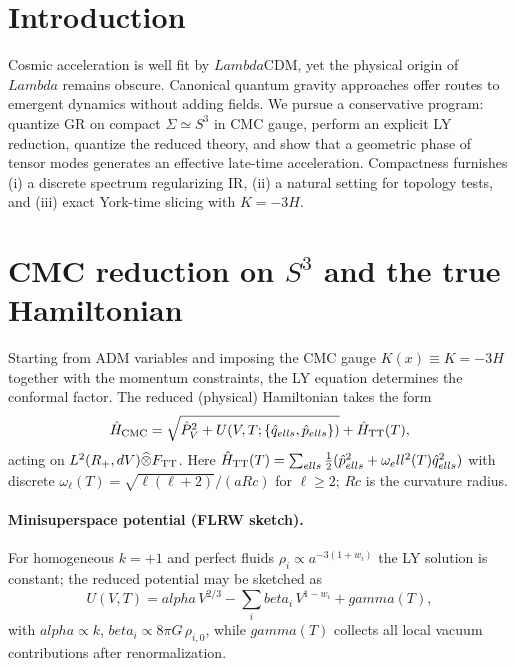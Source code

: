 \documentclass[aps,prd,twocolumn,amsmath,amssymb,nofootinbib,superscriptaddress]{revtex4-2}
\def\mathbb#1{#1}%
\def\mathcal#1{#1}%
\def\Rc{Rc}%
\def\Lambda{Lambda}%
\def\alpha{alpha}\def\beta{beta}\def\gamma{gamma}%
\newcommand{\Rc}{\mathcal{R}_c}
\newcommand{\cU}{\mathcal{U}}
\begin{document}
\section{Introduction}
Cosmic acceleration is well fit by $\Lambda$CDM, yet the physical origin of $\Lambda$ remains obscure. Canonical quantum gravity approaches \cite{DeWitt1967,HartleHawking,Vilenkin} offer routes to emergent dynamics without adding fields. We pursue a conservative program: quantize GR on compact $\Sigma\simeq S^3$ in CMC gauge, perform an explicit LY reduction, quantize the reduced theory, and show that a geometric phase of tensor modes generates an effective late-time acceleration. Compactness furnishes (i) a discrete spectrum regularizing IR, (ii) a natural setting for topology tests, and (iii) exact York-time slicing with $K=-3H$.

\section{CMC reduction on $S^3$ and the true Hamiltonian}
Starting from ADM variables and imposing the CMC gauge $K(x)\equiv K=-3H$ together with the momentum constraints, the LY equation determines the conformal factor. The reduced (physical) Hamiltonian takes the form
\begin{equation}
\hat H_{\rm CMC}=\sqrt{\hat P_V^2+\cU(V,T;\{\hat q_{\ell s},\hat p_{\ell s}\})}+\hat H_{\rm TT}(T),
\end{equation}
acting on ${L^2}(\mathbb{R}_+,dV)\widehat{\otimes}\mathcal{F}_{\rm TT}$. Here $\hat H_{\rm TT}(T)=\sum_{\ell s}\tfrac{1}{2}(\hat p_{\ell s}^2+\omega_\ell^2(T)\hat q_{\ell s}^2)$ with discrete $\omega_\ell(T)=\sqrt{\ell(\ell+2)}/(a\Rc)$ for $\ell\ge2$; $\Rc$ is the curvature radius.

\paragraph*{Minisuperspace potential (FLRW sketch).}
For homogeneous $k=+1$ and perfect fluids $\rho_i\propto a^{-3(1+w_i)}$ the LY solution is constant; the reduced potential may be sketched as
\begin{equation}
\cU(V,T)=\alpha\,V^{2/3}-\sum_i \beta_i\,V^{1-w_i}+\gamma(T),
\end{equation}
with $\alpha\propto k$, $\beta_i\propto 8\pi G\,\rho_{i,0}$, while $\gamma(T)$ collects all local vacuum contributions after renormalization.
\end{document}
